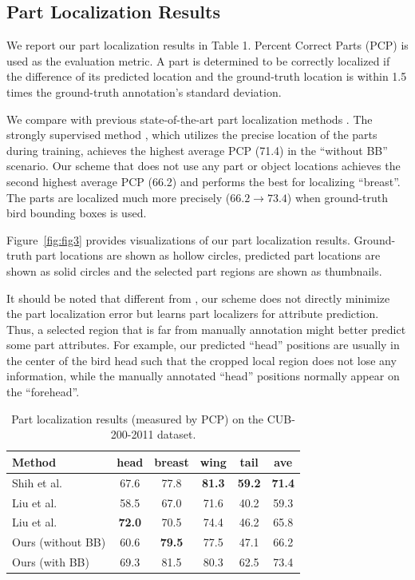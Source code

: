 \documentclass{article}
\begin{document}
\subsection{Part Localization Results}
We report our part localization results in Table 1. Percent Correct Parts (PCP) is used as the evaluation metric.
A part is determined to be correctly localized if the difference of its predicted location and the ground-truth location is within 1.5 times the ground-truth annotation’s standard deviation.

We compare with previous state-of-the-art part localization methods \cite{nips5,nips6,nips7}.
The strongly supervised method \cite{nips5}, which utilizes the precise location of the parts during training,  achieves the highest average PCP (71.4) in the ``without BB'' scenario.
Our scheme that does not use any part or object locations  achieves the second highest average PCP (66.2) and performs the best for localizing ``breast''.
The parts are localized much more precisely ($66.2 \to 73.4$) when ground-truth bird bounding boxes is used.

Figure~\ref{fig:fig3} provides visualizations of our part localization results.
Ground-truth part locations are shown as hollow circles, predicted part locations are shown as solid circles and the selected part regions are shown as thumbnails.

It should be noted that different from \cite{nips5}, our scheme does not directly minimize the part localization error but learns part localizers for attribute prediction.
Thus, a selected region that is far from manually annotation might better predict some part attributes.
For example, our predicted ``head'' positions are  usually in the center of the bird head such that the cropped local region does not lose any information,
while the manually annotated ``head'' positions normally appear on the ``forehead''.

\begin{table}[tbh!]
\begin{small}
\begin{center}
\caption{Part localization results (measured by PCP) on the CUB-200-2011 dataset.}
\begin{tabular}
{l||c|c|c|c|c}\hline
Method & head & breast & wing & tail & ave\\\hline
Shih et al. \cite{nips5} & 67.6 & 77.8 & \bf{81.3} & \bf{59.2} & \bf{71.4} \\
Liu et al. \cite{nips6} & 58.5 & 67.0 & 71.6 & 40.2 & 59.3\\
Liu et al. \cite{nips7} & \bf{72.0} & 70.5 & 74.4 & 46.2 & 65.8\\
Ours (without BB) & 60.6 & \bf{79.5} & 77.5 & 47.1 & 66.2 \\\hline
Ours (with BB) & 69.3 & 81.5 & 80.3& 62.5 & 73.4\\\hline
\end{tabular}
\end{center}
\end{small}
\vspace{-20pt}
\end{table}
\end{document}
